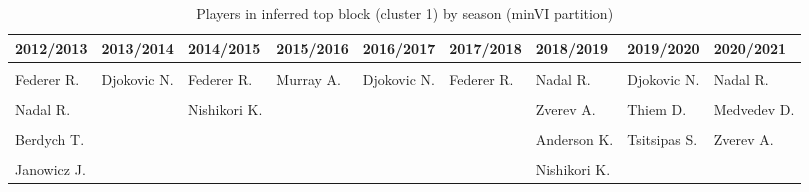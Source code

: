 \begin{table}[!h]
\centering
\caption{Players in inferred top block (cluster 1) by season (minVI partition)}
\centering
\begin{tabular}[t]{lllllllll}
\toprule
2012/2013 & 2013/2014 & 2014/2015 & 2015/2016 & 2016/2017 & 2017/2018 & 2018/2019 & 2019/2020 & 2020/2021\\
\midrule
\cellcolor{gray!10}{Djokovic N.} & \cellcolor{gray!10}{Nadal R.} & \cellcolor{gray!10}{Djokovic N.} & \cellcolor{gray!10}{Djokovic N.} & \cellcolor{gray!10}{Murray A.} & \cellcolor{gray!10}{Nadal R.} & \cellcolor{gray!10}{Djokovic N.} & \cellcolor{gray!10}{Nadal R.} & \cellcolor{gray!10}{Djokovic N.}\\
Federer R. & Djokovic N. & Federer R. & Murray A. & Djokovic N. & Federer R. & Nadal R. & Djokovic N. & Nadal R.\\
\cellcolor{gray!10}{Murray A.} & \cellcolor{gray!10}{Murray A.} & \cellcolor{gray!10}{Nadal R.} & \cellcolor{gray!10}{Federer R.} & \cellcolor{gray!10}{} & \cellcolor{gray!10}{} & \cellcolor{gray!10}{Federer R.} & \cellcolor{gray!10}{Federer R.} & \cellcolor{gray!10}{Thiem D.}\\
Nadal R. &  & Nishikori K. &  &  &  & Zverev A. & Thiem D. & Medvedev D.\\
\cellcolor{gray!10}{Ferrer D.} & \cellcolor{gray!10}{} & \cellcolor{gray!10}{} & \cellcolor{gray!10}{} & \cellcolor{gray!10}{} & \cellcolor{gray!10}{} & \cellcolor{gray!10}{del Potro J.M.} & \cellcolor{gray!10}{Medvedev D.} & \cellcolor{gray!10}{Tsitsipas S.}\\
\addlinespace
Berdych T. &  &  &  &  &  & Anderson K. & Tsitsipas S. & Zverev A.\\
\cellcolor{gray!10}{del Potro J.M.} & \cellcolor{gray!10}{} & \cellcolor{gray!10}{} & \cellcolor{gray!10}{} & \cellcolor{gray!10}{} & \cellcolor{gray!10}{} & \cellcolor{gray!10}{Thiem D.} & \cellcolor{gray!10}{} & \cellcolor{gray!10}{Rublev A.}\\
Janowicz J. &  &  &  &  &  & Nishikori K. &  & \\
\bottomrule
\end{tabular}
\end{table}
